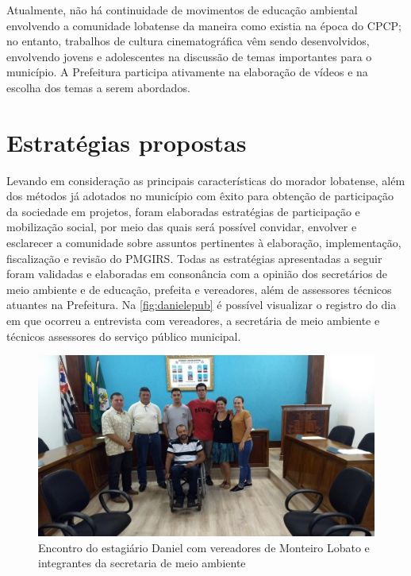 Atualmente, não há continuidade de movimentos de educação ambiental envolvendo a comunidade lobatense da maneira como existia na época do CPCP; no entanto, trabalhos de cultura cinematográfica vêm sendo desenvolvidos, envolvendo jovens e adolescentes na discussão de temas importantes para o município. A Prefeitura participa ativamente na elaboração de vídeos e na escolha dos temas a serem abordados. 

\section{Estratégias propostas}

Levando em consideração as principais características do morador lobatense, além dos métodos já adotados no município com êxito para obtenção de participação da sociedade em projetos, foram elaboradas estratégias de participação e mobilização social, por meio das quais será possível convidar, envolver e esclarecer a comunidade sobre assuntos pertinentes à elaboração, implementação, fiscalização e revisão do PMGIRS. Todas as estratégias apresentadas a seguir foram validadas e elaboradas em consonância com a opinião dos secretários de meio ambiente e de educação, prefeita e vereadores, além de assessores técnicos atuantes na Prefeitura. Na \autoref{fig:danielepub} é possível visualizar o registro do dia em que ocorreu a entrevista com vereadores, a secretária de meio ambiente e técnicos assessores do serviço público municipal.

\begin{figure}
	\centering
	\includegraphics[width=\linewidth]{produtos/produm/danielepub}
	\caption{Encontro do estagiário Daniel com vereadores de Monteiro Lobato e integrantes da secretaria de meio ambiente}
	\label{fig:danielepub}
\end{figure}

